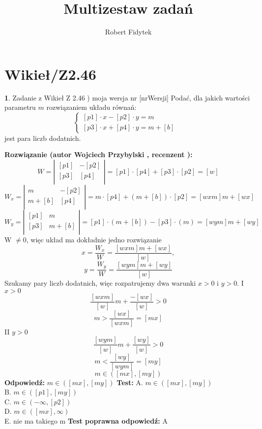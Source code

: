 \documentclass[12pt, a4paper]{article}
\title{Multizestaw zadań}
\author{Robert Fidytek}
\date{}
\theoremstyle{definition} %
\newtheorem{zad}{}
\newcommand{\kategoria}[1]{\section{#1}} %
\newcommand{\zadStart}[1]{\begin{zad}#1\newline} %
\newcommand{\zadStop}{\end{zad}}   %
\newcommand{\rozwStart}[2]{\noindent \textbf{Rozwiązanie (autor #1 , recenzent #2): }\newline} %
\newcommand{\rozwStop}{\newline}                                            %
\newcommand{\odpStart}{\noindent \textbf{Odpowiedź:}\newline}    %
\newcommand{\odpStop}{\newline}                                             %
\newcommand{\testStart}{\noindent \textbf{Test:}\newline} %
\newcommand{\testStop}{\newline} %
\newcommand{\kluczStart}{\noindent \textbf{Test poprawna odpowiedź:}\newline} %
\newcommand{\kluczStop}{\newline} %
\begin{document}
\maketitle


\kategoria{Wikieł/Z2.46}
\zadStart{Zadanie z Wikieł Z 2.46 ) moja wersja nr [nrWersji]}
Podać, dla jakich wartości parametru $m$ rozwiązaniem układu równań:
$$
 \left\{ \begin{array}{ll}
[p1]\cdot x-[p2]\cdot y=m & \\
{[p3]}\cdot x+[p4]\cdot y=m+[b]  & 
\end{array} \right.
$$
jest para liczb dodatnich.
\zadStop
\rozwStart{Wojciech Przybylski}{}
$$
W =
\left| \begin{array}{ccc}
[p1] & -[p2]  \\
{[p3]} & [p4]  \\
\end{array} \right| =[p1]\cdot[p4]+[p3]\cdot[p2]=[w]
$$
$$
W_{x} =
\left| \begin{array}{ccc}
m & -[p2]  \\
m+[b] & [p4]  \\
\end{array} \right| =m\cdot[p4]+(m+[b])\cdot[p2]=[wxm]m+[wx]
$$
$$
W_{y} =
\left| \begin{array}{ccc}
[p1] & m \\
{[p3]} & m+[b]  \\
\end{array} \right| =[p1]\cdot(m+[b])-[p3]\cdot(m)=[wym]m+[wy]
$$
W $\neq 0$, więc układ ma dokładnie jedno rozwiązanie
$$x=\frac{W_{x}}{W}=\frac{[wxm]m+[wx]}{[w]},$$
$$y=\frac{W_{y}}{W}=\frac{[wym]m+[wy]}{[w]}$$
Szukamy pary liczb dodatnich, więc rozpatrujemy dwa warunki $x>0$ i $y>0$.
I $x>0$
$$\frac{[wxm]}{[w]}m+\frac{-[wx]}{[w]}>0$$
$$m>\frac{[wx]}{[wxm]}=[mx]$$
II $y>0$
$$\frac{[wym]}{[w]}m+\frac{[wy]}{[w]}>0$$
$$m<\frac{[wy]}{[wym]}=[my]$$
$$m\in([mx],[my])$$
\rozwStop
\odpStart
$m\in([mx],[my])$
\odpStop
\testStart
A. $m\in([mx],[my])$\\
B. $m\in([p1],[my])$\\
C. $m\in(-\infty,[p2])$\\
D. $m\in([mx],\infty)$\\
E. nie ma takiego m 
\testStop
\kluczStart
A
\kluczStop
\end{document}
